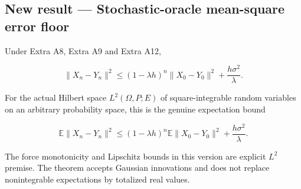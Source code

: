\documentclass[11pt,a4paper]{report}
\begin{document}
\subsection{\texorpdfstring{New result — Stochastic-oracle mean-square error floor}{New result — Stochastic-oracle mean-square error floor}}



Under Extra A8, Extra A9 and Extra A12,



\[\|X_n-Y_n\|^2\le(1-\lambda h)^n\|X_0-Y_0\|^2+\frac{h\sigma^2}{\lambda}.\]



For the actual Hilbert space \(L^2(\Omega,P;E)\) of square-integrable random variables on an arbitrary probability space, this is the genuine expectation bound



\[\mathbb E\|X_n-Y_n\|^2\le(1-\lambda h)^n\mathbb E\|X_0-Y_0\|^2+\frac{h\sigma^2}{\lambda}.\]



The force monotonicity and Lipschitz bounds in this version are explicit \(L^2\) premise. The theorem accepts Gaussian innovations and does not replace nonintegrable expectations by totalized real values.
\end{document}

